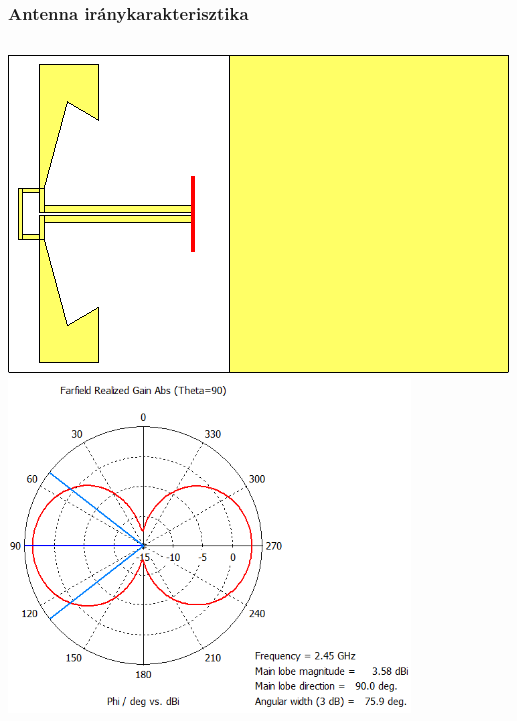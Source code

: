\documentclass[aspectratio=43]{beamer}
\begin{document}
\begin{frame}
	\frametitle{Antenna iránykarakterisztika}
		\begin{columns}
				\centering
				\includegraphics[width=\textwidth]{lying_bifa_bb_3D.png}
				\centering
				\includegraphics[width=0.8\textwidth]{bifa_broadband_pattern_theta90.png}
		\end{columns}
\end{frame}
\end{document}
